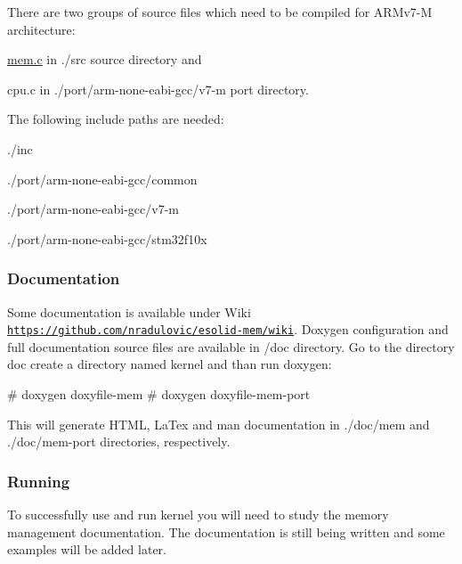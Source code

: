 There are two groups of source files which need to be compiled for A\-R\-Mv7-\/\-M architecture\-:
\begin{DoxyItemize}
\item \hyperlink{mem_8c}{mem.\-c} in {\ttfamily ./src} source directory and
\item cpu.\-c in {\ttfamily ./port/arm-\/none-\/eabi-\/gcc/v7-\/m} port directory.
\end{DoxyItemize}

The following include paths are needed\-:
\begin{DoxyItemize}
\item {\ttfamily ./inc}
\item {\ttfamily ./port/arm-\/none-\/eabi-\/gcc/common}
\item {\ttfamily ./port/arm-\/none-\/eabi-\/gcc/v7-\/m}
\item {\ttfamily ./port/arm-\/none-\/eabi-\/gcc/stm32f10x}
\end{DoxyItemize}

\subsubsection*{Documentation}

Some documentation is available under Wiki \href{https://github.com/nradulovic/esolid-mem/wiki}{\tt https\-://github.\-com/nradulovic/esolid-\/mem/wiki}. Doxygen configuration and full documentation source files are available in {\ttfamily /doc} directory. Go to the directory {\ttfamily doc} create a directory named {\ttfamily kernel} and than run doxygen\-: \begin{DoxyVerb}# doxygen doxyfile-mem
# doxygen doxyfile-mem-port
\end{DoxyVerb}


This will generate H\-T\-M\-L, La\-Tex and man documentation in {\ttfamily ./doc/mem} and {\ttfamily ./doc/mem-\/port} directories, respectively.

\subsubsection*{Running}

To successfully use and run kernel you will need to study the memory management documentation. The documentation is still being written and some examples will be added later. 
